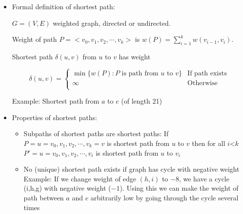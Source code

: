 \documentclass[twoside,12pt,a4paper,english]{book}
\theoremstyle{definition}
\theoremstyle{problemstyle}
\theoremstyle{problemstyle}
\theoremstyle{problemstyle}
\begin{document}
\begin{itemize}
\item Formal definition of shortest path: 

  $G = (V,E)$ weighted graph, directed or undirected. 

Weight of path $P = <v_0,v_1,v_2, \cdots, v_k>$ is $w(P) =
  \sum_{i=1}^k w(v_{i-1},v_i)$. 

Shortest path $\delta(u,v)$ from $u$ to $v$ has weight
  
  \[ \delta(u,v) = \left\{ \begin{array}{ll}
                \min\{w(P): \mbox{$P$ is path from $u$ to $v$}\} & \mbox{If
                  path exists} \\
                \infty                                     & \mbox{Otherwise} \\
              \end{array} \right. \]
            
            Example: Shortest path from $a$ to $e$ (of length 21) \\

            \centerline{}
            
\item Properties of shortest paths:
            
\begin{itemize}
\item Subpaths of shortest paths are shortest paths: If $P = u=v_0,v_1,v_2, \cdots, v_k=v$ is shortest path from $u$ to $v$
  then for all $i$<$k$ $P' = u=v_0,v_1,v_2, \cdots, v_i$ is shortest
  path from $u$ to $v_i$
  
  
\item No (unique) shortest path exists if graph has cycle with
  negative weight \\
  
  Example: If we change weight of edge $(h,i)$ to $-8$, we have a
  cycle (i,h,g) with negative weight ($-1$). Using this we can make the 
  weight of path between $a$ and $e$ arbitrarily low by going through
  the cycle several times \\
  
  \centerline{}
  

\end{itemize}
\end{itemize}
\end{document}
